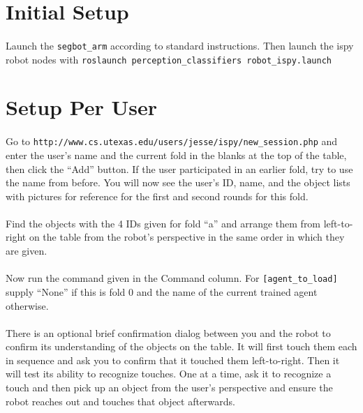 \documentclass{article}
\begin{document}
\section{Initial Setup}

\paragraph{} Launch the \texttt{segbot\_arm} according to standard instructions. Then launch the ispy robot nodes with \texttt{roslaunch perception\_classifiers robot\_ispy.launch}

\section{Setup Per User}

\paragraph{} Go to \texttt{http://www.cs.utexas.edu/users/jesse/ispy/new\_session.php} and enter the user's name and the current fold in the blanks at the top of the table, then click the ``Add'' button. If the user participated in an earlier fold, try to use the name from before. You will now see the user's ID, name, and the object lists with pictures for reference for the first and second rounds for this fold.

\paragraph{} Find the objects with the 4 IDs given for fold ``a'' and arrange them from left-to-right on the table from the robot's perspective in the same order in which they are given.

\paragraph{} Now run the command given in the Command column. For \texttt{[agent\_to\_load]} supply ``None'' if this is fold 0 and the name of the current trained agent otherwise.

\paragraph{} There is an optional brief confirmation dialog between you and the robot to confirm its understanding of the objects on the table. It will first touch them each in sequence and ask you to confirm that it touched them left-to-right. Then it will test its ability to recognize touches. One at a time, ask it to recognize a touch and then pick up an object from the user's perspective and ensure the robot reaches out and touches that object afterwards.
\end{document}

